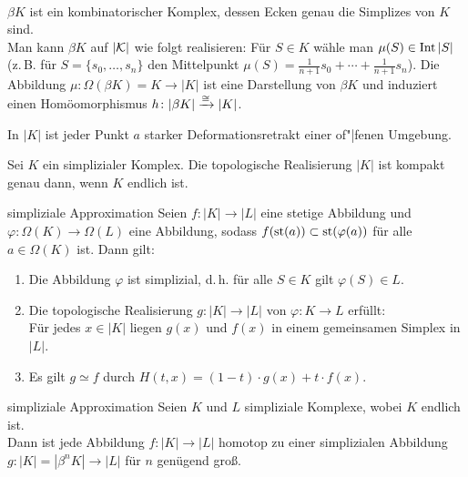 \begin{Bem}\\
    $\beta K$ ist ein kombinatorischer Komplex, dessen Ecken genau die
    Simplizes von $K$ sind. \\
    Man kann $\beta K$ auf $|\mathcal{K}|$ wie folgt realisieren:
    Für $S \in K$ wähle man $\mu(S) \in \operatorname{Int} |S|$
    (z.\,B. für $S = \{s_0, \dotsc, s_n\}$ den Mittelpunkt
    $\mu(S) = \frac{1}{n + 1} s_0 + \dotsb + \frac{1}{n + 1} s_n$).
    Die Abbildung $\mu\colon \Omega(\beta K) = K \rightarrow |K|$ ist
    eine Darstellung von $\beta K$ und induziert einen Homöomorphismus
    $h\colon |\beta K| \xrightarrow{\cong} |K|$.
\end{Bem}

\begin{Kor}
    In $|K|$ ist jeder Punkt $a$ starker Deformationsretrakt einer of"|fenen
    Umgebung.
\end{Kor}

\begin{Kor}
    Sei $K$ ein simplizialer Komplex.
    Die topologische Realisierung $|K|$ ist kompakt genau dann, wenn
    $K$ endlich ist.
\end{Kor}

\linie

\begin{Lemma}{simpliziale Approximation}
    Seien $f\colon |K| \rightarrow |L|$ eine stetige Abbildung und \\
    $\varphi\colon \Omega(K) \rightarrow \Omega(L)$ eine Abbildung,
    sodass $f(\operatorname{st}(a)) \subset \operatorname{st}(\varphi(a))$ für alle $a \in \Omega(K)$ ist.
    Dann gilt:
    \begin{enumerate}
        \item
        Die Abbildung $\varphi$ ist simplizial, d.\,h.
        für alle $S \in K$ gilt $\varphi(S) \in L$.

        \item
        Die topologische Realisierung $g\colon |K| \rightarrow |L|$ von
        $\varphi\colon K \rightarrow L$ erfüllt: \\
        Für jedes $x \in |K|$ liegen $g(x)$ und $f(x)$ in einem gemeinsamen
        Simplex in $|L|$.

        \item
        Es gilt $g \simeq f$ durch
        $H(t, x) = (1 - t) \cdot g(x) + t \cdot f(x)$.
    \end{enumerate}
\end{Lemma}

\begin{Satz}{simpliziale Approximation}
    Seien $K$ und $L$ simpliziale Komplexe, wobei $K$ endlich ist. \\
    Dann ist jede Abbildung $f\colon |K| \rightarrow |L|$ homotop zu einer
    simplizialen Abbildung \\
    $g\colon |K| = |\beta^n K| \rightarrow |L|$ für $n$ genügend groß.
\end{Satz}

